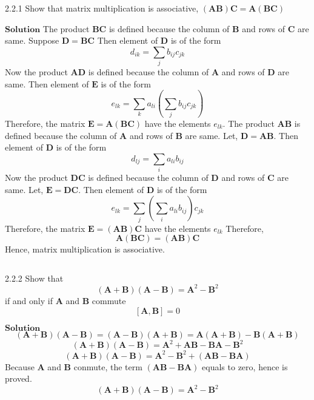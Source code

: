 

\begin{mybox}{2.2.1}
Show that matrix multiplication is associative, $(\mathbf{A}\mathbf{B}) \mathbf{C}=\mathbf{A}(\mathbf{B}\mathbf{C})$
\end{mybox}



$\boxed{\textbf{Solution}}$ The product $\mathbf{BC}$ is defined because the column of $\mathbf{B}$ and rows of $\mathbf{C}$ are same.
Suppose $\mathbf{D}=\mathbf{BC}$
Then element of $\mathbf{D}$ is of the form
$$d_{ik}=\sum_{j} b_{ij} c_{j k}$$
Now the product $\mathbf{AD}$ is defined because the column of $\mathbf{A}$ and rows of $\mathbf{D}$ are same. Then element of $\mathbf{E}$ is of the form
$$e_{l k}=\sum_{k} a_{l i}\left(\sum_{j} b_{i j} c_{j k}\right)$$
Therefore, the matrix $\mathbf{E}=\mathbf{A}(\mathbf{B} \mathbf{C})$ have the elements $e_{lk}$. The product $\mathbf{AB}$ is defined because the column of $\mathbf{A}$ and rows of $\mathbf{B}$ are same. Let, $\mathbf{D}=\mathbf{AB}$. Then element of $\mathbf{D}$ is of the form
$$d_{l j}=\sum_{i} a_{li} b_{i j}$$
Now the product $\mathbf{D C}$ is defined because the column of $\mathbf{D}$ and rows of $\mathbf{C}$ are same. Let, $\mathbf{E}=\mathbf{D C}$. Then element of $\mathbf{D}$ is of the form
$$e_{lk}=\sum_{j}\left(\sum_{i} a_{li} b_{i j}\right) c_{j k}$$
Therefore, the matrix $\mathbf{E}=(\mathbf{A} \mathbf{B}) \mathbf{C}$ have the elements $e_{lk}$
Therefore,
$$\mathbf{A}(\mathbf{B} \mathbf{C})=(\mathbf{A} \mathbf{B}) \mathbf{C}$$
Hence, matrix multiplication is associative.

$$$$

\begin{mybox}{2.2.2}
Show that
$$
(\mathbf{A}+\mathbf{B})(\mathbf{A}-\mathbf{B})=\mathbf{A}^{2}-\mathbf{B}^{2}
$$
if and only if $\mathbf{A}$ and $\mathbf{B}$ commute
$$[\mathbf{A}, \mathbf{B}]=0$$
\end{mybox}




$\boxed{\textbf{Solution}}$ 
$$(\mathbf{A}+\mathbf{B})(\mathbf{A}-\mathbf{B})=(\mathbf{A}-\mathbf{B})(\mathbf{A}+\mathbf{B})=\mathbf{A}(\mathbf{A}+\mathbf{B})-\mathbf{B}(\mathbf{A}+\mathbf{B})$$
$$(\mathbf{A}+\mathbf{B})(\mathbf{A}-\mathbf{B})=\mathbf{A}^2+\mathbf{A}\mathbf{B}-\mathbf{B}\mathbf{A}-\mathbf{B}^2$$
$$(\mathbf{A}+\mathbf{B})(\mathbf{A}-\mathbf{B})=\mathbf{A}^2-\mathbf{B}^2+(\mathbf{A}\mathbf{B}-\mathbf{B}\mathbf{A})$$
Because $\mathbf{A}$ and $\mathbf{B}$ conmute, the term $(\mathbf{A}\mathbf{B}-\mathbf{B}\mathbf{A})$ equals to zero, hence is proved.
$$(\mathbf{A}+\mathbf{B})(\mathbf{A}-\mathbf{B})=\mathbf{A}^2 -\mathbf{B}^2$$


